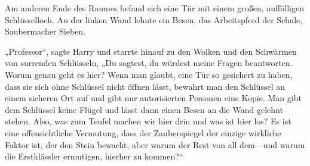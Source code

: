 Am anderen Ende des Raumes befand sich eine Tür mit einem großen, auffälligen Schlüsselloch.
An der linken Wand lehnte ein Besen, das Arbeitspferd der Schule, Saubermacher Sieben.

„Professor“, sagte Harry und starrte hinauf zu den Wolken und den Schwärmen von surrenden Schlüsseln,
„Du sagtest, du würdest meine Fragen beantworten. Worum genau geht es hier? Wenn man glaubt, eine Tür so gesichert zu haben, dass sie sich ohne Schlüssel nicht öffnen lässt, bewahrt man den Schlüssel an einem sicheren Ort auf und gibt nur autorisierten Personen eine Kopie. Man gibt dem Schlüssel keine Flügel und lässt dann einen Besen an die Wand gelehnt stehen. Also, was zum Teufel machen wir hier drin und was ist hier los? Es ist eine offensichtliche Vermutung, dass der Zauberspiegel der einzige wirkliche Faktor ist, der den Stein bewacht, aber warum der Rest von all dem—und warum die Erstklässler ermutigen, hierher zu kommen?“

